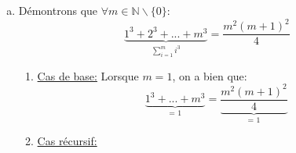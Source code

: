 \documentclass{report}
\begin{document}

\section{} %
  \begin{enumerate}[a. ]
  \addtocounter{enumi}{1} %
  \item 

	D\'{e}montrons que $\forall m \in \mathbb{N} \backslash  \big\{0\big\} : $
	\newline
      	\[  \underbrace{1^{3} +  2^{3} + ... +  m^{3}}_\text{$\sum_{i=1}^{m} i^{3}$} =  \frac{ m^{2} (m+1)	^{2}}{4}  \]
  \begin{enumerate}[\textperiodcentered]

     \item \underline{Cas de base:}
      \newline Lorsque  $m=1$, on a bien que: \newline
      	\[  \underbrace{1^{3} + ... +  m^{3}}_\text{= 1} =  \underbrace{\frac{ m^{2} (m+1)^{2}}{4}}_\text{= 1} \]
	     
	     
	     
      \item \underline{Cas r\'{e}cursif:}

     \end{enumerate}

  

  
  
  \end{enumerate}

 
 
\end{document}
